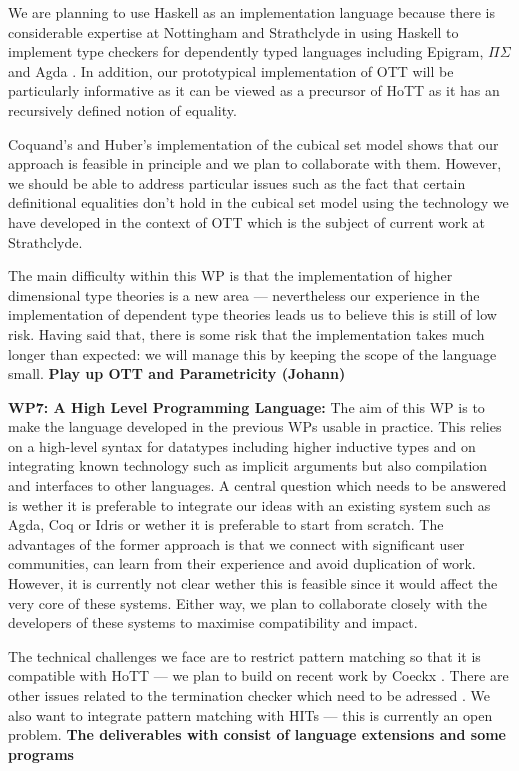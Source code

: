 \documentclass[a4paper,11pt]{article}
\begin{document}
We are planning to use Haskell as an implementation language because
there is considerable expertise at Nottingham and Strathclyde in using
Haskell to implement type checkers for dependently typed languages
including Epigram, $\Pi\Sigma$ and Agda \cite{epigram,easy,alti:pisigma-new}.
In addition, our prototypical implementation of OTT will be
particularly informative as it can be viewed as a precursor of HoTT as
it has an recursively defined notion of equality. 

Coquand's and Huber's implementation of the cubical set model shows
that our approach is feasible in principle and we plan to collaborate
with them. However, we should be able to address particular issues
such as the fact that certain definitional equalities don't hold in
the cubical set model using the technology we have developed in the
context of OTT \cite{alti:ott-conf} which is the subject of current
work at Strathclyde.

The main difficulty within this WP is that the implementation of
higher dimensional type theories is a new area --- nevertheless our
experience in the implementation of dependent type theories leads us
to believe this is still of low risk. Having said that, there is some
risk that the implementation takes much longer than expected: we will
manage this by keeping the scope of the language small. {\bf Play up OTT and Parametricity (Johann)}

{\bf WP7: A High Level Programming Language:}
The aim of this WP is to make the language developed in the previous
WPs usable in practice. This relies on a high-level syntax for
datatypes including higher inductive types and on integrating known
technology such as implicit arguments but also compilation and
interfaces to other languages. A central question which needs to be
answered is wether it is preferable to integrate our ideas with an
existing system such as Agda, Coq or Idris or wether it is preferable
to start from scratch. The advantages of the former approach is that
we connect with significant user communities, can learn from their
experience and avoid duplication of work. However, it is currently
not clear wether this is feasible since it would affect the very
core of these systems. Either way, we plan to collaborate closely with
the developers of these systems to maximise compatibility and impact.

The technical challenges we face are to restrict pattern matching so
that it is compatible with HoTT --- we plan to build on recent work
by Coeckx \cite{coeckx-without-k}. There are other issues
related to the termination checker which need to be adressed
\cite{coq-agda-issue-w-termination}. We also want to integrate pattern
matching with HITs --- this is currently an open problem. {\bf The
deliverables with consist of language extensions and some programs}
\end{document}
